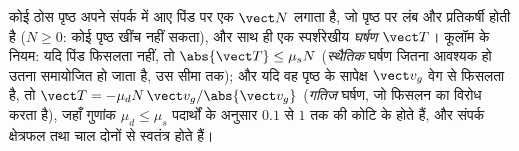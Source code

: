 \begin{proposition}[संस्पर्श बल: अभिलंब प्रतिक्रिया और शुष्क घर्षण]\label{prop:b1:newton-dynamics:friction}
कोई ठोस पृष्ठ अपने संपर्क में आए पिंड पर एक \emph{}
$\vect N$ लगाता है, जो पृष्ठ पर लंब और प्रतिकर्षी होती है ($N \geq 0$: कोई
पृष्ठ खींच नहीं सकता), और साथ ही एक स्पर्शरेखीय \emph{घर्षण } $\vect T$।
कूलॉम के नियम: यदि पिंड फिसलता नहीं, तो $\abs{\vect T} \leq \mu_s N$
(\emph{स्थैतिक} घर्षण जितना आवश्यक हो उतना समायोजित हो जाता है, उस सीमा
तक); और यदि वह पृष्ठ के सापेक्ष $\vect v_g$ वेग से फिसलता है, तो
$\vect T = -\mu_d N\,\vect v_g/\abs{\vect v_g}$ (\emph{गतिज} घर्षण, जो
फिसलन का विरोध करता है), जहाँ गुणांक $\mu_d \leq \mu_s$ पदार्थों के अनुसार
$0.1$ से $1$ तक की कोटि के होते हैं, और संपर्क क्षेत्रफल तथा चाल दोनों से
स्वतंत्र होते हैं।
\end{proposition}
\admitted

